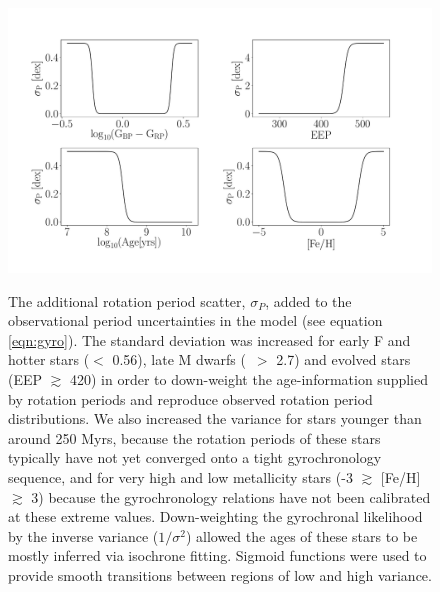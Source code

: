 \begin{figure}
  \caption{
    The additional rotation period scatter, $\sigma_P$, added to the
    observational period uncertainties in the model (see equation
    \ref{eqn:gyro}).
    The standard deviation was increased for early F and hotter
    stars (\gcolor $<$ 0.56), late M dwarfs (\gcolor\ $>$ 2.7) and evolved
    stars (EEP $\gtrsim$ 420) in order to down-weight the age-information
    supplied
    by rotation periods and reproduce observed rotation period distributions.
    We also increased the variance for stars younger than around 250 Myrs,
    because the rotation periods of these stars typically have not yet
    converged onto a tight gyrochronology sequence, and for very high and low
    metallicity stars (-3 $\gtrsim$ [Fe/H] $\gtrsim$ 3) because the
    gyrochronology relations have not been calibrated at these extreme values.
    Down-weighting the gyrochronal likelihood by the inverse variance
    ($1/\sigma^2$) allowed the ages of these stars to be mostly inferred
    via isochrone fitting.
    Sigmoid functions were used to provide smooth transitions between regions
    of low and high variance.
}
  \centering
    \includegraphics[width=1.\textwidth]{variance}
\label{fig:variance}
\end{figure}

